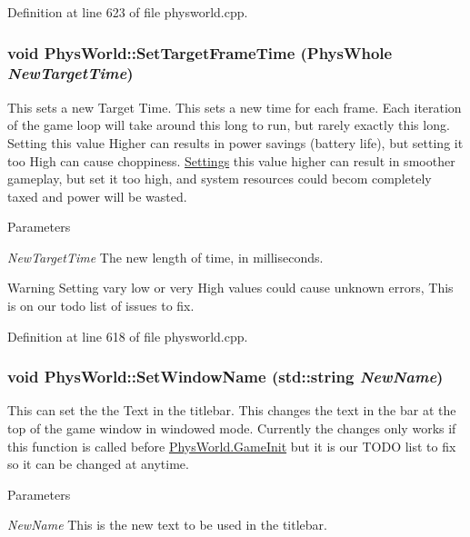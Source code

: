 Definition at line 623 of file physworld.cpp.\hypertarget{classPhysWorld_ab1c6f9286bd97eb502d8b0ddc4954566}{
\subsubsection[{SetTargetFrameTime}]{\setlength{\rightskip}{0pt plus 5cm}void PhysWorld::SetTargetFrameTime (PhysWhole {\em NewTargetTime})}}
\label{db/df5/classPhysWorld_ab1c6f9286bd97eb502d8b0ddc4954566}


This sets a new Target Time. This sets a new time for each frame. Each iteration of the game loop will take around this long to run, but rarely exactly this long. Setting this value Higher can results in power savings (battery life), but setting it too High can cause choppiness. \hyperlink{classSettings}{Settings} this value higher can result in smoother gameplay, but set it too high, and system resources could becom completely taxed and power will be wasted. 
\begin{DoxyParams}{Parameters}
\item[{\em NewTargetTime}]The new length of time, in milliseconds. \end{DoxyParams}
\begin{DoxyWarning}{Warning}
Setting vary low or very High values could cause unknown errors, This is on our todo list of issues to fix. 
\end{DoxyWarning}


Definition at line 618 of file physworld.cpp.\hypertarget{classPhysWorld_adb5ba2b5a3140c5d7033d3180e3f7342}{
\subsubsection[{SetWindowName}]{\setlength{\rightskip}{0pt plus 5cm}void PhysWorld::SetWindowName (std::string {\em NewName})}}
\label{db/df5/classPhysWorld_adb5ba2b5a3140c5d7033d3180e3f7342}


This can set the the Text in the titlebar. This changes the text in the bar at the top of the game window in windowed mode. Currently the changes only works if this function is called before \hyperlink{classPhysWorld_afc5116f97cc1e91e899d1a1ca7e14e9b}{PhysWorld.GameInit} but it is our TODO list to fix so it can be changed at anytime. 
\begin{DoxyParams}{Parameters}
\item[{\em NewName}]This is the new text to be used in the titlebar. \end{DoxyParams}


